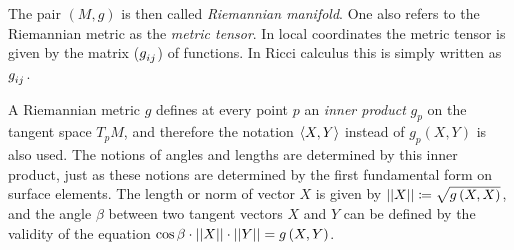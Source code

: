 \documentclass[../main.tex]{subfiles}
\begin{document}
\begin{remark}\label{Manifold:Riemannian}
The pair \(\left(M,g\right)\) is then called \textit{Riemannian manifold}.
One also refers to the Riemannian metric as the \textit{metric tensor}.
In local coordinates the metric tensor is given by the matrix (\(\tensor{g}{_i_j}\)) of functions.
In Ricci calculus this is simply written as \(\tensor{g}{_i_j}\).
{\autocite[][Chapter~5C]{kuhnelwolfgang_2006}}
\end{remark}
\begin{remark}\label{Manifold:InnerProduct}
A Riemannian metric \(g\) defines at every point \(p\)
an \textit{inner product} \(g_p\) on the tangent space \(T_pM\),
and therefore the notation \(\left\langle{X},{Y}\right\rangle\) instead of \(g_p\left(X,Y\right)\) is also used.
The notions of angles and lengths are determined by this inner product,
just as these notions are determined by the first fundamental form on surface elements.
The length or norm of vector \(X\) is given by \(\left|\left|{X}\right|\right|\coloneqq\sqrt{g\left(X,X\right)}\),
and the angle \(\beta\) between two tangent vectors \(X\) and \(Y\)
can be defined by the validity of the equation \(\cos\beta\cdot\left|\left|{X}\right|\right|\cdot\left|\left|{Y}\right|\right|=g\left(X,Y\right)\).
{\autocite[][Chapter~5C]{kuhnelwolfgang_2006}}
\end{remark}
\end{document}
